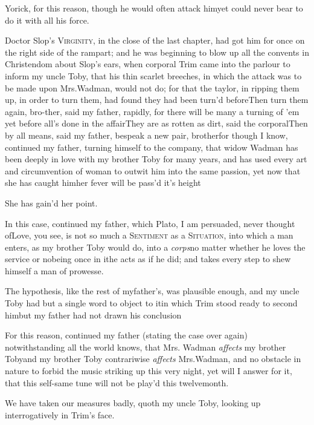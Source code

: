 \documentclass{article}
\begin{document}
Yorick, for this reason, though he would often attack
him\tsk yet could never bear to do it with all his force.

Doctor Slop’s \textsc{Virginity}, in the
close of the last chapter, had got him for once on the right side
of the rampart; and he was beginning to blow up all the convents in
Christendom about Slop’s ears, when corporal
Trim came into the parlour to inform my uncle Toby,
that his thin scarlet breeches, in which the attack was to be made
upon Mrs.\@ Wadman, would not do; for that the taylor, in
ripping them up, in order to turn them, had found they had been
turn’d before\tsh Then turn them again, bro-\break ther,
said my father, rapidly, for there will be many a turning of
’em yet before all’s done in the
affair\tsh They are as rotten as dirt, said the
corporal\tsh\break Then by all means, said my father, bespeak a
new pair, brother\tsh for though I know, continued my
father, turning himself to the company, that widow Wadman
has been deeply in love with my brother Toby for many years,
and has used every art and circumvention of woman to outwit him
into the same passion, yet now that she has caught
him\tsh her fever will be pass’d it’s\break
height\tsh

\tsh She has gain’d her point.

In this case, continued my father, which Plato, I am
persuaded, never thought of\tsh Love, you see, is not so
much a \textsc{Sentiment} as a \textsc{Situation}, into
which a man enters, as my brother Toby would do, into a
\textit{corps}\tsh no matter whether he loves the service or
no\tsh being once in it\tsk he acts as if he did; and
takes every step to shew himself a man of prowesse.

The hypothesis, like the rest of my\break father’s, was
plausible enough, and my uncle Toby had but a single word to
object to it\tsk in which Trim stood ready to second
him\tsh but my father had not drawn his
conclusion\tsh

For this reason, continued my father (stating the case over
again) notwithstanding all the world knows, that Mrs.
Wadman \textit{affects} my brother Toby\tsk and my brother
Toby contrariwise \textit{affects} Mrs.\@ Wadman, and no
obstacle in nature to forbid the music striking up this very night,
yet will I answer for it, that this self-same tune will not be
play’d this twelvemonth.

We have taken our measures badly, quoth my uncle Toby,
looking up interrogatively in Trim’s face.
\end{document}
